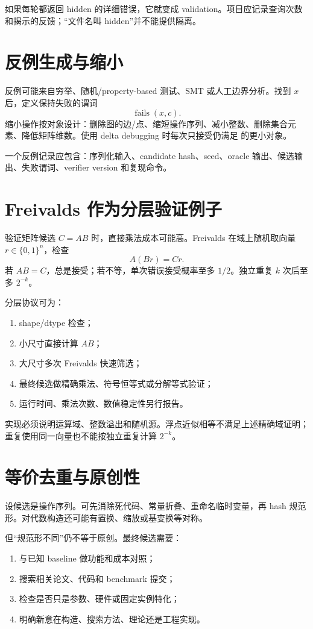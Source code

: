 如果每轮都返回 hidden 的详细错误，它就变成 validation。项目应记录查询次数和揭示的反馈；“文件名叫 hidden”并不能提供隔离。

\section{反例生成与缩小}

反例可能来自穷举、随机/property-based 测试、SMT 或人工边界分析。找到 $x$ 后，定义保持失败的谓词
\[
\operatorname{fails}(x,c).
\]
缩小操作按对象设计：删除图的边/点、缩短操作序列、减小整数、删除集合元素、降低矩阵维数。使用 delta debugging 时每次只接受仍满足  的更小对象。

一个反例记录应包含：序列化输入、candidate hash、seed、oracle 输出、候选输出、失败谓词、verifier version 和复现命令。

\section{Freivalds 作为分层验证例子}

验证矩阵候选 $C=AB$ 时，直接乘法成本可能高。Freivalds 在域上随机取向量 $r\in\{0,1\}^n$，检查
\[
A(Br)=Cr.
\]
若 $AB=C$，总是接受；若不等，单次错误接受概率至多 $1/2$。独立重复 $k$ 次后至多 $2^{-k}$。

分层协议可为：
\begin{enumerate}
  \item shape/dtype 检查；
  \item 小尺寸直接计算 $AB$；
  \item 大尺寸多次 Freivalds 快速筛选；
  \item 最终候选做精确乘法、符号恒等式或分解等式验证；
  \item 运行时间、乘法次数、数值稳定性另行报告。
\end{enumerate}

\begin{warningbox}
实现必须说明运算域、整数溢出和随机源。浮点近似相等不满足上述精确域证明；重复使用同一向量也不能按独立重复计算 $2^{-k}$。
\end{warningbox}

\section{等价去重与原创性}

设候选是操作序列。可先消除死代码、常量折叠、重命名临时变量，再 hash 规范形。对代数构造还可能有置换、缩放或基变换等对称。

但“规范形不同”仍不等于原创。最终候选需要：
\begin{enumerate}
  \item 与已知 baseline 做功能和成本对照；
  \item 搜索相关论文、代码和 benchmark 提交；
  \item 检查是否只是参数、硬件或固定实例特化；
  \item 明确新意在构造、搜索方法、理论还是工程实现。
\end{enumerate}

